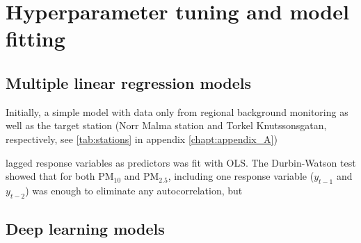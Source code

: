 \section{Hyperparameter tuning and model fitting}
\label{sec:tuning}

\subsection{Multiple linear regression models}
Initially, a simple model with data only from regional background monitoring as well as the target station (Norr Malma station and Torkel Knutssonsgatan, respectively, see \cref{tab:stations} in appendix \ref{chapt:appendix_A}) 

 lagged response variables as predictors was fit with OLS. The Durbin-Watson test showed that for both PM$_{10}$ and PM$_{2.5}$, including one response variable ($y_{t-1}$ and $y_{t-2}$) was enough to eliminate any autocorrelation, but 

\subsection{Deep learning models}

